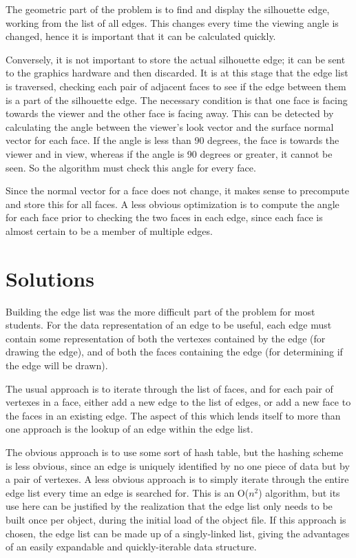 \documentclass[10pt,twocolumn]{article}
\begin{document}
The geometric part of the problem is to find and display the silhouette edge, working from the list of all edges.  This changes every time the viewing angle is changed, hence it is important that it can be calculated quickly.  

Conversely, it is not important to store the actual silhouette edge; it can be sent to the graphics hardware and then discarded.  It is at this stage that the edge list is traversed, checking each pair of adjacent faces to see if the edge between them is a part of the silhouette edge.  The necessary condition is that one face is facing towards the viewer and the other face is facing away.  This can be detected by calculating the angle between the viewer's look vector and the surface normal vector for each face.  If the angle is less than 90 degrees, the face is towards the viewer and in view, whereas if the angle is 90 degrees or greater, it cannot be seen.  So the algorithm must check this angle for every face.  

Since the normal vector for a face does not change, it makes sense to precompute and store this for all faces.  A less obvious optimization is to compute the angle for each face prior to checking the two faces in each edge, since each face is almost certain to be a member of multiple edges.  

\section{Solutions}
Building the edge list was the more difficult part of the problem for most students.  For the data representation of an edge to be useful, each edge must contain some representation of both the vertexes contained by the edge (for drawing the edge), and of both the faces containing the edge (for determining if the edge will be drawn).  

The usual approach is to iterate through the list of faces, and for each pair of vertexes in a face, either add a new edge to the list of edges, or add a new face to the faces in an existing edge.  The aspect of this which lends itself to more than one approach is the lookup of an edge within the edge list.  

The obvious approach is to use some sort of hash table, but the hashing scheme is less obvious, since an edge is uniquely identified by no one piece of data but by a pair of vertexes.  A less obvious approach is to simply iterate through the entire edge list every time an edge is searched for.  This is an O($n^2$) algorithm, but its use here can be justified by the realization that the edge list only needs to be built once per object, during the initial load of the object file.  If this approach is chosen, the edge list can be made up of a singly-linked list, giving the advantages of an easily expandable and quickly-iterable data structure.  
\end{document}
